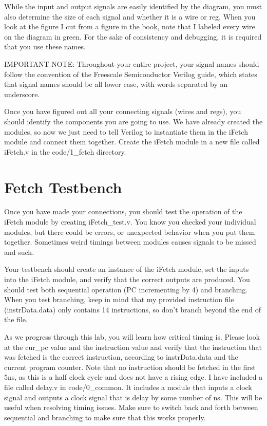 While the input and output signals are easily identified by the diagram, you must also determine the size of each signal and whether it is a wire or reg.  When you look at the figure I cut from a figure in the book, note that I labeled every wire on the diagram in green.  For the sake of consistency and debugging, it is required that you use these names.  

IMPORTANT NOTE: Throughout your entire project, your signal names should follow the convention of the Freescale Semiconductor Verilog guide, which states that signal names should be all lower case, with words separated by an underscore.   

Once you have figured out all your connecting signals (wires and regs), you should identify the components you are going to use.  We have already created the modules, so now we just need to tell Verilog to instantiate them in the iFetch module and connect them together.  Create the iFetch module in a new file called iFetch.v in the code/1\_fetch directory.  

\section{Fetch Testbench}
Once you have made your connections, you should test the operation of the iFetch module by creating iFetch\_test.v.  You know you checked your individual modules, but there could be errors, or unexpected behavior when you put them together.  Sometimes weird timings between modules causes signals to be missed and such.  

Your testbench should create an instance of the iFetch module, set the inputs into the iFetch module, and verify that the correct outputs are produced. You should test both sequential operation (PC incrementing by 4) and branching.  When you test branching, keep in mind that my provided instruction file (instrData.data) only contains 14 instructions, so don't branch beyond the end of the file.

As we progress through this lab, you will learn how critical timing is.  Please look at the cur\_pc value and the instruction value and verify that the instruction that was fetched is the correct instruction, according to instrData.data and the current program counter.  Note that no instruction should be fetched in the first 5ns, as this is a half clock cycle and does not have a rising edge.  I have included a file called delay.v in code/0\_common.  It includes a module that inputs a clock signal and outputs a clock signal that is delay by some number of ns.  This will be useful when resolving timing issues.  Make sure to switch back and forth between sequential and branching to make sure that this works properly.


